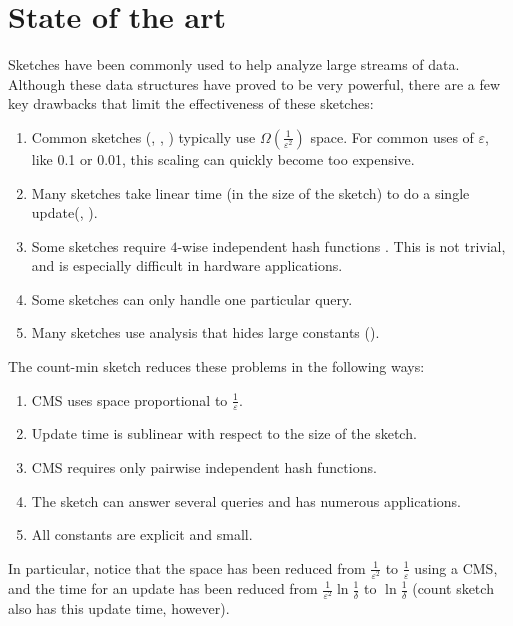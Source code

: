 \documentclass[11pt]{article}
\newcommand{\comment}[1]{}
\begin{document}
\section{State of the art}
Sketches have been commonly used to help analyze large streams of data. \comment{These sketches allow for the following types of queries: $L_1$ and $L_2$ norms, number of distinct items in a sequence, join size of relations, range sum queries, and more.} Although these data structures have proved to be very powerful, there are a few key drawbacks that limit the effectiveness of these sketches:
\begin{enumerate}
    \item Common sketches (\cite{AGMS99}, \cite{CCF02}, \cite{GKMS02})  typically use $\Omega(\frac{1}{\varepsilon^2})$ space. For common uses of $\varepsilon$, like 0.1 or 0.01, this scaling can quickly become too expensive.
    \item Many sketches take linear time (in the size of the sketch) to do a single update(\cite{AGMS99}, \cite{GKMS02}).
    \item Some sketches require $4$-wise independent hash functions \cite{AGMS99}. This is not trivial, and is especially difficult in hardware applications.
    \item Some sketches can only handle one particular query.
    \item Many sketches use analysis that hides large constants (\cite{CCF02}).
\end{enumerate}
The count-min sketch reduces these problems in the following ways:
\begin{enumerate}
    \item CMS uses space proportional to $\frac{1}{\varepsilon}$.
    \item Update time is sublinear with respect to the size of the sketch.
    \item CMS requires only pairwise independent hash functions.
    \item The sketch can answer several queries and has numerous applications.
    \item All constants are explicit and small.
\end{enumerate}
In particular, notice that the space has been reduced from
$\frac{1}{\varepsilon^2}$ to $\frac{1}{\varepsilon}$ using a CMS, and the time
for an update has been reduced from $\frac{1}{\varepsilon^2}\ln{\frac{1}{\delta}}$
to $\ln{\frac{1}{\delta}}$ (count sketch also has this update time, however).
\end{document}
